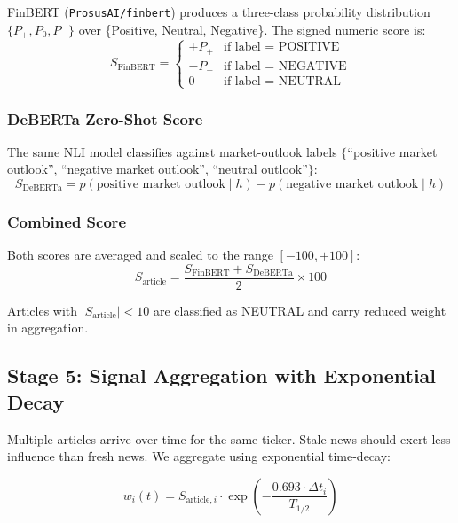 \documentclass[12pt, a4paper]{article}
\begin{document}
FinBERT (\texttt{ProsusAI/finbert}) produces a three-class probability distribution $\{P_+, P_0, P_-\}$ over \{Positive, Neutral, Negative\}. The signed numeric score is:
\begin{equation}
    S_{\text{FinBERT}} = \begin{cases}
        +P_+ & \text{if label = POSITIVE} \\
        -P_- & \text{if label = NEGATIVE} \\
        0    & \text{if label = NEUTRAL}
    \end{cases}
\end{equation}

\subsubsection{DeBERTa Zero-Shot Score}

The same NLI model classifies against market-outlook labels $\{$``positive market outlook'', ``negative market outlook'', ``neutral outlook''$\}$:
\begin{equation}
    S_{\text{DeBERTa}} = p(\text{positive market outlook} \mid h) - p(\text{negative market outlook} \mid h)
\end{equation}

\subsubsection{Combined Score}

Both scores are averaged and scaled to the range $[-100, +100]$:
\begin{equation}
    \boxed{S_{\text{article}} = \frac{S_{\text{FinBERT}} + S_{\text{DeBERTa}}}{2} \times 100}
    \label{eq:sentiment}
\end{equation}

Articles with $|S_{\text{article}}| < 10$ are classified as NEUTRAL and carry reduced weight in aggregation.

\subsection{Stage 5: Signal Aggregation with Exponential Decay}

Multiple articles arrive over time for the same ticker. Stale news should exert less influence than fresh news. We aggregate using exponential time-decay:

\begin{equation}
    w_i(t) = S_{\text{article},i} \cdot \exp\!\left(-\frac{0.693 \cdot \Delta t_i}{T_{1/2}}\right)
    \label{eq:decay}
\end{equation}
\end{document}
